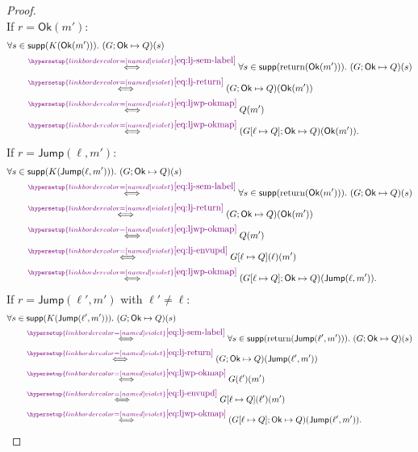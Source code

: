 \documentclass[acmsmall,natbib,review,screen,anonymous,10pt]{acmart}
\makeatletter
\let\@msm@th@eqref\eqref
\renewcommand{\eqref}[1]{%
  \begingroup
  \leavevmode
  \color{violet}%
  \hypersetup{linkbordercolor=[named]{violet}}%
  \@msm@th@eqref{#1}%
  \endgroup
}
\makeatother
\begin{document}
\begin{proof}
\[\]
If $r=\mathsf{Ok}(m')$:
\[
  \begin{aligned}
  &\forall s\in\supp(K(\mathsf{Ok}(m'))).\ (G;\mathsf{Ok}\mapsto Q)(s)\\
  &\qquad\overset{\eqref{eq:lj-sem-label}}{\iff}
  \forall s\in\supp(\operatorname{return}(\mathsf{Ok}(m'))).\
  (G;\mathsf{Ok}\mapsto Q)(s)\\
  &\qquad\overset{\eqref{eq:lj-return}}{\iff}
  (G;\mathsf{Ok}\mapsto Q)(\mathsf{Ok}(m'))\\
  &\qquad\overset{\eqref{eq:ljwp-okmap}}{\iff}
  Q(m')\\
  &\qquad\overset{\eqref{eq:ljwp-okmap}}{\iff}
  (G[\ell\mapsto Q];\mathsf{Ok}\mapsto Q)(\mathsf{Ok}(m')).
  \end{aligned}
\]
If $r=\mathsf{Jump}(\ell,m')$:
\[
  \begin{aligned}
  &\forall s\in\supp(K(\mathsf{Jump}(\ell,m'))).\ (G;\mathsf{Ok}\mapsto Q)(s)\\
  &\qquad\overset{\eqref{eq:lj-sem-label}}{\iff}
  \forall s\in\supp(\operatorname{return}(\mathsf{Ok}(m'))).\
  (G;\mathsf{Ok}\mapsto Q)(s)\\
  &\qquad\overset{\eqref{eq:lj-return}}{\iff}
  (G;\mathsf{Ok}\mapsto Q)(\mathsf{Ok}(m'))\\
  &\qquad\overset{\eqref{eq:ljwp-okmap}}{\iff}
  Q(m')\\
  &\qquad\overset{\eqref{eq:lj-envupd}}{\iff}
  G[\ell\mapsto Q](\ell)(m')\\
  &\qquad\overset{\eqref{eq:ljwp-okmap}}{\iff}
  (G[\ell\mapsto Q];\mathsf{Ok}\mapsto Q)(\mathsf{Jump}(\ell,m')).
  \end{aligned}
\]
If $r=\mathsf{Jump}(\ell',m')$ with $\ell'\neq\ell$:
\[
  \begin{aligned}
  &\forall s\in\supp(K(\mathsf{Jump}(\ell',m'))).\ (G;\mathsf{Ok}\mapsto Q)(s)\\
  &\qquad\overset{\eqref{eq:lj-sem-label}}{\iff}
  \forall s\in\supp(\operatorname{return}(\mathsf{Jump}(\ell',m'))).\
  (G;\mathsf{Ok}\mapsto Q)(s)\\
  &\qquad\overset{\eqref{eq:lj-return}}{\iff}
  (G;\mathsf{Ok}\mapsto Q)(\mathsf{Jump}(\ell',m'))\\
  &\qquad\overset{\eqref{eq:ljwp-okmap}}{\iff}
  G(\ell')(m')\\
  &\qquad\overset{\eqref{eq:lj-envupd}}{\iff}
  G[\ell\mapsto Q](\ell')(m')\\
  &\qquad\overset{\eqref{eq:ljwp-okmap}}{\iff}
  (G[\ell\mapsto Q];\mathsf{Ok}\mapsto Q)(\mathsf{Jump}(\ell',m')).
  \end{aligned}
\]
\end{proof}
\end{document}

